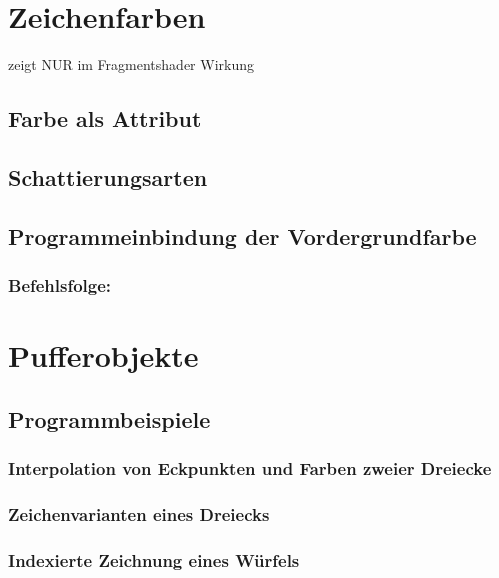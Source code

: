 \section{Zeichenfarben}
zeigt NUR im Fragmentshader Wirkung
\subsection{Farbe als Attribut}
\subsection{Schattierungsarten}
\subsection{Programmeinbindung der Vordergrundfarbe}
\subsubsection*{Befehlsfolge:}

\section{Pufferobjekte}
\subsection{Programmbeispiele}
\subsubsection*{Interpolation von Eckpunkten und Farben zweier Dreiecke}
\subsubsection*{Zeichenvarianten eines Dreiecks}
\subsubsection*{Indexierte Zeichnung eines Würfels}

